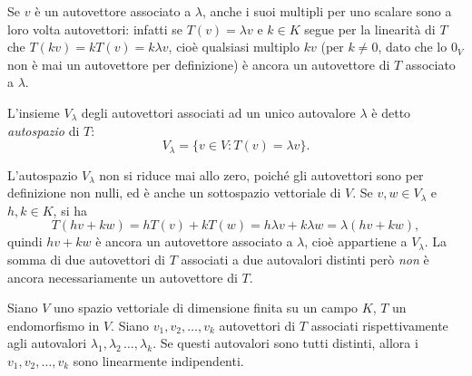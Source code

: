 Se $v$ è un autovettore associato a $\lambda$, anche i suoi multipli per uno scalare sono a loro volta autovettori: infatti se $T(v)=\lambda v$ e $k\in K$ segue per la linearità di $T$ che $T(kv)=kT(v)=k\lambda v$, cioè qualsiasi multiplo $kv$ (per $k\ne 0$, dato che lo $0_V$ non è mai un autovettore per definizione) è ancora un autovettore di $T$ associato a $\lambda$.
\begin{definizione} \label{d:autospazio}
	L'insieme $V_\lambda$ degli autovettori associati ad un unico autovalore $\lambda$ è detto \emph{autospazio} di $T$:
	\begin{equation*}
	V_\lambda=\{v\in V\colon T(v)=\lambda v\}.
	\end{equation*}
\end{definizione}
L'autospazio $V_\lambda$ non si riduce mai allo zero, poiché gli autovettori sono per definizione non nulli, ed è anche un sottospazio vettoriale di $V$.
Se $v,w\in V_\lambda$ e $h,k\in K$, si ha
\begin{equation*}
	T(hv+kw)=hT(v)+kT(w)=h\lambda v+k\lambda w=\lambda(hv+kw),
\end{equation*}
quindi $hv+kw$ è ancora un autovettore associato a $\lambda$, cioè appartiene a $V_\lambda$.
La somma di due autovettori di $T$ associati a due autovalori distinti però \emph{non} è ancora necessariamente un autovettore di $T$.
\begin{teorema} \label{t:autovettori-linearmente-indipendenti}
	Siano $V$ uno spazio vettoriale di dimensione finita su un campo $K$, $T$ un endomorfismo in $V$. Siano $v_1,v_2,\dots,v_k$ autovettori di $T$ associati rispettivamente agli autovalori $\lambda_1,\lambda_2\,\dots,\lambda_k$. Se questi autovalori sono tutti distinti, allora i $v_1,v_2,\dots,v_k$ sono linearmente indipendenti.
\end{teorema}
